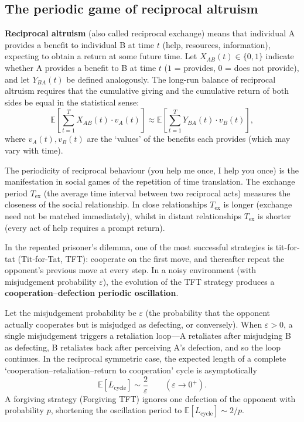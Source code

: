 \subsection{The periodic game of reciprocal altruism}

\begin{definition}\label{def:reciprocal_altruism}
\textbf{Reciprocal altruism} (also called reciprocal exchange) means that individual A provides a benefit to individual B at time $t$ (help, resources, information), expecting to obtain a return at some future time. Let $X_{AB}(t) \in \{0,1\}$ indicate whether A provides a benefit to B at time $t$ ($1$ = provides, $0$ = does not provide), and let $Y_{BA}(t)$ be defined analogously. The long-run balance of reciprocal altruism requires that the cumulative giving and the cumulative return of both sides be equal in the statistical sense:
\[
\mathbb{E}\left[\sum_{t=1}^{T} X_{AB}(t) \cdot v_A(t)\right] \approx \mathbb{E}\left[\sum_{t=1}^{T} Y_{BA}(t) \cdot v_B(t)\right],
\]
where $v_A(t), v_B(t)$ are the `values' of the benefits each provides (which may vary with time).

The periodicity of reciprocal behaviour (you help me once, I help you once) is the manifestation in social games of the repetition of time translation. The exchange period $T_{\text{ex}}$ (the average time interval between two reciprocal acts) measures the closeness of the social relationship. In close relationships $T_{\text{ex}}$ is longer (exchange need not be matched immediately), whilst in distant relationships $T_{\text{ex}}$ is shorter (every act of help requires a prompt return).
\end{definition}

\begin{proposition}\label{prop:tit_for_tat_period}
In the repeated prisoner's dilemma, one of the most successful strategies is tit-for-tat (Tit-for-Tat, TFT): cooperate on the first move, and thereafter repeat the opponent's previous move at every step. In a noisy environment (with misjudgement probability $\varepsilon$), the evolution of the TFT strategy produces a \textbf{cooperation--defection periodic oscillation}.

Let the misjudgement probability be $\varepsilon$ (the probability that the opponent actually cooperates but is misjudged as defecting, or conversely). When $\varepsilon > 0$, a single misjudgement triggers a retaliation loop---A retaliates after misjudging B as defecting, B retaliates back after perceiving A's defection, and so the loop continues. In the reciprocal symmetric case, the expected length of a complete `cooperation--retaliation--return to cooperation' cycle is asymptotically
\[
\mathbb{E}[L_{\text{cycle}}] \sim \frac{2}{\varepsilon} \qquad (\varepsilon \to 0^+).
\]
A forgiving strategy (Forgiving TFT) ignores one defection of the opponent with probability $p$, shortening the oscillation period to $\mathbb{E}[L_{\text{cycle}}] \sim 2/p$.
\end{proposition}

